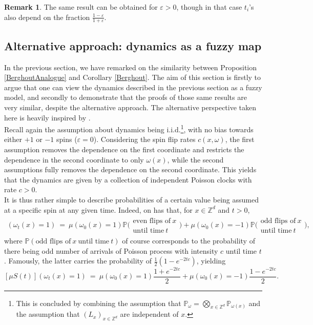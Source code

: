 \documentclass[12pt]{article}
\renewcommand{\P}{\mathbb{P}}
\newcommand{\Z}{\mathbb{Z}}
\newcommand{\1}{\mathbbm{1}}
\newcommand{\5}{\vspace{0.5cm}}
\theoremstyle{definition}
\newtheorem{rem}[thm]{Remark}
\begin{document}
\begin{rem}
The same result can be obtained for $\varepsilon>0$, though in that case $t_i$'s also depend on the fraction $\frac{1-\varepsilon}{1+\varepsilon}$.
\end{rem}


\subsection{Alternative approach: dynamics as a fuzzy map}

In the previous section, we have remarked on the similarity between Proposition \ref{BerghoutAnalogue} and Corollary \ref{Berghout}. The aim of this section is firstly to argue that one can view the dynamics described in the previous section as a fuzzy model, and secondly to demonstrate that the proofs of those same results are very similar, despite the alternative approach. The alternative perspective taken here is heavily inspired by \cite{Ver}. \\

Recall again the assumption about dynamics being i.i.d.\footnote{This is concluded by combining the assumption that $\P_\omega=\bigotimes_{x\in\Z^d}\P_{\omega(x)}$ and the assumption that $(L_x)_{x\in\Z^d}$ are independent of $x$.}, with no bias towards either $+1$ or $-1$ spins ($\varepsilon=0$). Considering the spin flip rates $c(x,\omega)$, the first assumption removes the dependence on the first coordinate and restricts the dependence in the second coordinate to only $\omega(x)$, while the second assumptions fully removes the dependence on the second coordinate. This yields that the dynamics are given by a collection of independent Poisson clocks with rate $c>0$. \\

It is thus rather simple to describe probabilities of a certain value being assumed at a specific spin at any given time. Indeed, on has that, for $x\in\Z^d$ and $t>0$,
\begin{align*}
[\mu S(t)](\omega_t(x)=1) ~=~ \mu(\omega_0(x)=1)\P\big(\substack{\text{even flips of}~x\\\text{until time}~t}\big) + \mu(\omega_0(x)=-1)\P\big(\substack{\text{odd flips of}~x\\\text{until time}~t}\big),
\end{align*}
where $\P(\text{odd flips of}~x~\text{until time}~t)$ of course corresponds to the probability of there being odd number of arrivals of Poisson process with intensity $c$ until time $t$. Famously, the latter carries the probability of $\frac{1}{2}(1-e^{-2tc})$, yielding
$$[\mu S(t)](\omega_t(x)=1) ~=~ \mu(\omega_0(x)=1)\frac{1+e^{-2tc}}{2} + \mu(\omega_0(x)=-1)\frac{1-e^{-2tc}}{2}.$$
\end{document}
